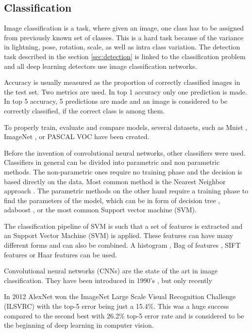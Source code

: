 \documentclass[a4paper,12pt,titlepage, twoside]{article}
\numberwithin{figure}{section}
\begin{document}
\subsection{Classification}

Image classification is a task, where given an image, one class has to be assigned from previously known set of classes. This is a hard task because of the variance in lightning, pose, rotation, scale, as well as intra class variation. The detection task described in the section \ref{sec:detection} is linked to the classification problem and all deep learning detectors use image classification networks.

Accuracy is usually measured as the proportion of correctly classified images in the test set. Two metrics are used. In top 1 accuracy only one prediction is made. In top 5 accuracy, 5 predictions are made and an image is considered to be correctly classified, if the correct class is among them.

To properly train, evaluate and compare models, several datasets, such as Mnist \cite{lecun-mnisthandwrittendigit-2010}, ImageNet \cite{deng2009imagenet}, or PASCAL VOC \cite{Everingham10} have been created.

Before the invention of convolutional neural networks, other classifiers were used. Classifiers in general can be divided into parametric and non parametric methods. The non-parametric ones require no training phase and the decision is based directly on the data. Most common method is the Nearest Neighbor approach \cite{boiman2008defense, zhang2006svm}. The parametric methods on the other hand require a training phase to find the parameters of the model, which can be in form of decision tree \cite{bosch2007image}, adaboost \cite{opelt2004weak}, or the most common Support vector machine (SVM).

The classification pipeline of SVM is such that a set of features is extracted and an Support Vector Machine (SVM) is applied. These features can have many different forms and can also be combined. A histogram \cite{chapelle1999support}, Bag of features \cite{lazebnik2006beyond, nowak2006sampling}, SIFT features \cite{yang2009linear, bicego2006use} or Haar features \cite{munder2006experimental} can be used.

Convolutional neural networks (CNNs) are the state of the art in image classification. They have been introduced in 1990's \cite{lecun1989backpropagation}, but only recently 

In 2012 AlexNet \cite{krizhevsky2012imagenet} won the ImageNet Large Scale Visual Recognition Challenge (ILSVRC) with the top-5 error being just a 15.4\%. This was a huge success compared to the second best with 26.2\% top-5 error rate and is considered to be the beginning of deep learning in computer vision. 
\end{document}
